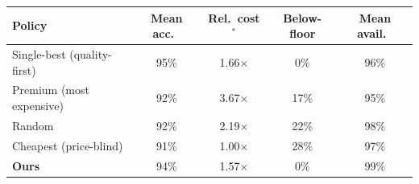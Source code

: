 \begin{tabular}{lcccc}
\toprule
Policy & Mean acc.\ & Rel.\ cost$^\ast$ & Below-floor & Mean avail.\ \\
\midrule
Single-best (quality-first) & 95\% & 1.66$\times$ & 0\% & 96\% \\
Premium (most expensive) & 92\% & 3.67$\times$ & 17\% & 95\% \\
Random & 92\% & 2.19$\times$ & 22\% & 98\% \\
Cheapest (price-blind) & 91\% & 1.00$\times$ & 28\% & 97\% \\
\textbf{Ours} & 94\% & 1.57$\times$ & 0\% & 99\% \\
\bottomrule
\end{tabular}